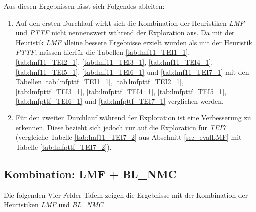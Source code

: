 \begin{multicols}{2}
\columnbreak
{}
\end{multicols}
\noindent
Aus diesen Ergebnissen lässt sich Folgendes ableiten:
\begin{enumerate}
\item 
Auf den ersten Durchlauf wirkt sich die Kombination der Heuristiken \emph{LMF} und \emph{PTTF} nicht nennenswert während der Exploration aus.
Da mit der Heuristik \emph{LMF} alleine bessere Ergebnisse erzielt wurden als mit der Heuristik \emph{PTTF}, müssen hierfür die Tabellen \ref{tab:lmf11_TEI1_1}, \ref{tab:lmf11_TEI2_1}, \ref{tab:lmf11_TEI3_1}, \ref{tab:lmf11_TEI4_1}, \ref{tab:lmf11_TEI5_1}, \ref{tab:lmf11_TEI6_1} und \ref{tab:lmf11_TEI7_1} mit den Tabellen \ref{tab:lmfpttf_TEI1_1}, \ref{tab:lmfpttf_TEI2_1}, \ref{tab:lmfpttf_TEI3_1}, \ref{tab:lmfpttf_TEI4_1}, \ref{tab:lmfpttf_TEI5_1}, \ref{tab:lmfpttf_TEI6_1} und \ref{tab:lmfpttf_TEI7_1} verglichen werden.

\item 
Für den zweiten Durchlauf während der Exploration ist eine Verbesserung zu erkennen. Diese bezieht sich jedoch nur auf die Exploration für \emph{TEI7} (vergleiche Tabelle \ref{tab:lmf11_TEI7_2} aus Abschnitt \ref{sec_evalLMF} mit Tabelle \ref{tab:lmfpttf_TEI7_2}).
\end{enumerate}

\subsection{Kombination: LMF + BL\_NMC}\label{sec_evalLMFBLNMC}
Die folgenden Vier-Felder Tafeln zeigen die Ergebnisse mit der Kombination der Heuristiken \emph{LMF} und \emph{BL\_NMC}.
\begin{multicols}{3}
\columnbreak
{}\columnbreak
{}
\end{multicols}

\begin{multicols}{2}
\columnbreak
{}
\end{multicols}

